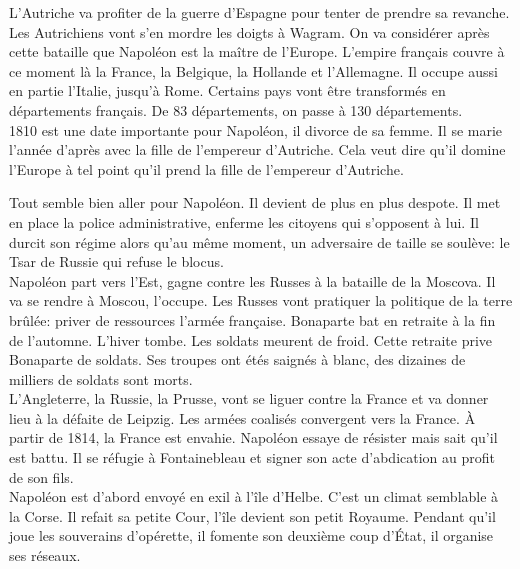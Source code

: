 \documentclass[10pt, a4paper, openany]{book}
\begin{document}
L'Autriche va profiter de la guerre d'Espagne pour tenter de prendre sa revanche. Les Autrichiens vont s'en mordre les doigts à Wagram. On va considérer après cette bataille que Napoléon est la maître de l'Europe. L'empire français couvre à ce moment là la France, la Belgique, la Hollande et l'Allemagne. Il occupe aussi en partie l'Italie, jusqu'à Rome. Certains pays vont être transformés en départements français. De 83 départements, on passe à 130 départements. \\
1810 est une date importante pour Napoléon, il divorce de sa femme. Il se marie l'année d'après avec la fille de l'empereur d'Autriche. Cela veut dire qu'il domine l'Europe à tel point qu'il prend la fille de l'empereur d'Autriche. 


Tout semble bien aller pour Napoléon. Il devient de plus en plus despote. Il met en place la police administrative, enferme les citoyens qui s'opposent à lui. Il durcit son régime alors qu'au même moment, un adversaire de taille se soulève: le Tsar de Russie qui refuse le blocus. \\
Napoléon part vers l'Est, gagne contre les Russes à la bataille de la Moscova. Il va se rendre à Moscou, l'occupe. Les Russes vont pratiquer la politique de la terre brûlée: priver de ressources l'armée française. Bonaparte bat en retraite à la fin de l'automne. L'hiver tombe. Les soldats meurent de froid. Cette retraite prive Bonaparte de soldats. Ses troupes ont étés saignés à blanc, des dizaines de milliers de soldats sont morts. \\
L'Angleterre, la Russie, la Prusse, vont se liguer contre la France et va donner lieu à la défaite de Leipzig. Les armées coalisés convergent vers la France. À partir de 1814, la France est envahie. Napoléon essaye de résister mais sait qu'il est battu. Il se réfugie à Fontainebleau et signer son acte d'abdication au profit de son fils. \\
Napoléon est d'abord envoyé en exil à l'île d'Helbe. C'est un climat semblable à la Corse. Il refait sa petite Cour, l'île devient son petit Royaume. Pendant qu'il joue les souverains d'opérette, il fomente son deuxième coup d'État, il organise ses réseaux. 
\end{document}

